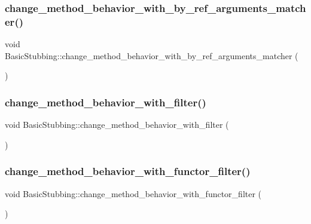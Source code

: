\subsubsection{\texorpdfstring{change\_method\_behavior\_with\_by\_ref\_arguments\_matcher()}{change\_method\_behavior\_with\_by\_ref\_arguments\_matcher()}}
{\footnotesize\ttfamily void Basic\+Stubbing\+::change\+\_\+method\+\_\+behavior\+\_\+with\+\_\+by\+\_\+ref\+\_\+arguments\+\_\+matcher (\begin{DoxyParamCaption}{ }\end{DoxyParamCaption})\hspace{0.3cm}{\ttfamily [inline]}}

\mbox{\label{structBasicStubbing_a318596a5a12a4fd61a5210f15f861580}} 
\subsubsection{\texorpdfstring{change\_method\_behavior\_with\_filter()}{change\_method\_behavior\_with\_filter()}}
{\footnotesize\ttfamily void Basic\+Stubbing\+::change\+\_\+method\+\_\+behavior\+\_\+with\+\_\+filter (\begin{DoxyParamCaption}{ }\end{DoxyParamCaption})\hspace{0.3cm}{\ttfamily [inline]}}

\mbox{\label{structBasicStubbing_a485e4cb22bb0b5f80744b18f110d5f58}} 
\subsubsection{\texorpdfstring{change\_method\_behavior\_with\_functor\_filter()}{change\_method\_behavior\_with\_functor\_filter()}}
{\footnotesize\ttfamily void Basic\+Stubbing\+::change\+\_\+method\+\_\+behavior\+\_\+with\+\_\+functor\+\_\+filter (\begin{DoxyParamCaption}{ }\end{DoxyParamCaption})\hspace{0.3cm}{\ttfamily [inline]}}


